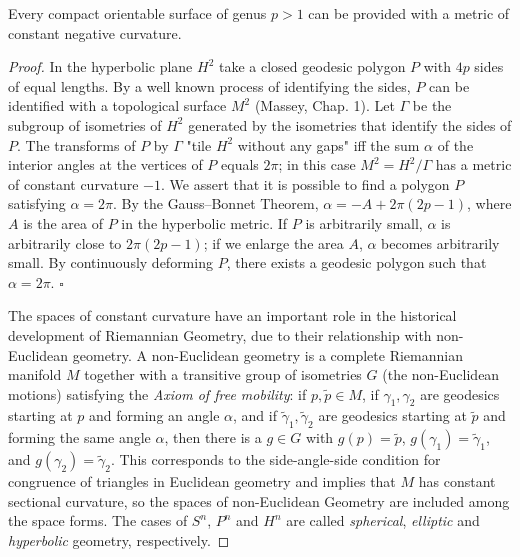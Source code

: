 \begin{proposition}
  \label{prop:dc-ch8-4-5}
  \notready
  Every compact orientable surface of genus $p>1$ can be provided with a metric of
  constant negative curvature.
\end{proposition}
\begin{proof}
  In the hyperbolic plane $H^2$ take a closed geodesic polygon $P$ with $4p$
  sides of equal lengths. By a well known process of identifying the sides, $P$ can
  be identified with a topological surface $M^2$ (Massey, Chap. 1). Let $\Gamma$ be
  the subgroup of isometries of $H^2$ generated by the isometries that identify the
  sides of $P$. The transforms of $P$ by $\Gamma$ "tile $H^2$ without any gaps" iff
  the sum $\alpha$ of the interior angles at the vertices of $P$ equals $2\pi$; in
  this case $M^2=H^2/\Gamma$ has a metric of constant curvature $-1$. We assert that
  it is possible to find a polygon $P$ satisfying $\alpha=2\pi$. By the Gauss–Bonnet
  Theorem, $\alpha=-A+2\pi(2p-1)$, where $A$ is the area of $P$ in the hyperbolic
  metric. If $P$ is arbitrarily small, $\alpha$ is arbitrarily close to $2\pi(2p-1)$;
  if we enlarge the area $A$, $\alpha$ becomes arbitrarily small. By continuously
  deforming $P$, there exists a geodesic polygon such that $\alpha=2\pi$. $\square$
  
  The spaces of constant curvature have an important role in the historical
  development of Riemannian Geometry, due to their relationship with non-Euclidean
  geometry. A non-Euclidean geometry is a complete Riemannian manifold $M$ together
  with a transitive group of isometries $G$ (the non-Euclidean motions) satisfying
  the \emph{Axiom of free mobility}: if $p,\tilde p\in M$, if $\gamma_1,\gamma_2$ are
  geodesics starting at $p$ and forming an angle $\alpha$, and if
  $\tilde\gamma_1,\tilde\gamma_2$ are geodesics starting at $\tilde p$ and forming
  the same angle $\alpha$, then there is a $g\in G$ with $g(p)=\tilde p$,
  $g(\gamma_1)=\tilde\gamma_1$, and $g(\gamma_2)=\tilde\gamma_2$. This corresponds
  to the side-angle-side condition for congruence of triangles in Euclidean geometry
  and implies that $M$ has constant sectional curvature, so the spaces of
  non-Euclidean Geometry are included among the space forms. The cases of $S^n$,
  $P^n$ and $H^n$ are called \emph{spherical}, \emph{elliptic} and \emph{hyperbolic} geometry,
  respectively.
\end{proof}

